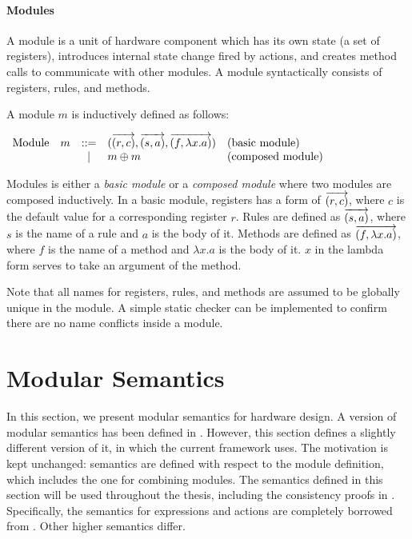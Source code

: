 \paragraph{Modules}
A module is a unit of hardware component which has its own state (a
set of registers), introduces internal state change fired by actions,
and creates method calls to communicate with other modules. A module
syntactically consists of registers, rules, and methods.

\begin{definition}
  \label{def-module}
  A module $m$ is inductively defined as follows:
  \begin{center}
    \begin{math}
      \begin{array}{rcll}
        \textrm{Module}\quad m & ::=
        & (\overrightarrow{(r, c)}, \overrightarrow{(s, a)}, \overrightarrow{(f, \lambda x.a)})
        & \textrm{(basic module)} \\
        & | & m \oplus m & \textrm{(composed module)}
      \end{array}
    \end{math}
  \end{center}
\end{definition}

Modules is either a \emph{basic module} or a \emph{composed module}
where two modules are composed inductively. In a basic module,
registers has a form of $\overrightarrow{(r, c)}$, where $c$ is the
default value for a corresponding register $r$. Rules are defined as
$\overrightarrow{(s, a)}$, where $s$ is the name of a rule and $a$ is
the body of it. Methods are defined as $\overrightarrow{(f, \lambda
    x.a)}$, where $f$ is the name of a method and $\lambda x.a$ is the
body of it. $x$ in the lambda form serves to take an argument of the
method.

Note that all names for registers, rules, and methods are assumed to
be globally unique in the module. A simple static checker can be
implemented to confirm there are no name conflicts inside a module.

\section{Modular Semantics}
\label{sec-semmod}

In this section, we present modular semantics for hardware design. A
version of modular semantics has been defined in \cite{murali-thesis}.
However, this section defines a slightly different version of it, in
which the current \Kami{} framework uses. The motivation is kept
unchanged: semantics are defined with respect to the module
definition, which includes the one for combining modules. The
semantics defined in this section will be used throughout the thesis,
including the consistency proofs in . Specifically, the
semantics for expressions and actions are completely borrowed from
\cite{murali-thesis}. Other higher semantics differ.

